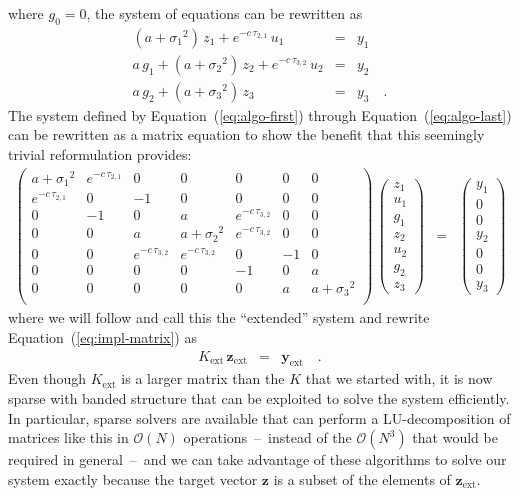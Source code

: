 \documentclass[manuscript, letterpaper]{aastex6}
\renewcommand{\eqref}[1]{\ref{eq:#1}}
\newcommand{\Eq}[1]{Equation~(\eqref{#1})}
\newcommand{\eq}[1]{\Eq{#1}}
\newcommand{\eqlabel}[1]{\label{eq:#1}}
\newcommand{\bvec}[1]{{\ensuremath{\boldsymbol{#1}}}}
\begin{document}
where $g_{0} = 0$,
the system of equations can be rewritten as
\begin{eqnarray}
(a+{\sigma_1}^2)\,z_1 + e^{-c\,\tau_{2,1}}\,u_1 &=& y_1 \\
a\,g_1 + (a+{\sigma_2}^2)\,z_2 + e^{-c\,\tau_{3,2}}\,u_2 &=& y_2 \\
a\,g_2 + (a+{\sigma_3}^2)\,z_3 &=& y_3 \quad. \eqlabel{algo-last}
\end{eqnarray}
The system defined by \eq{algo-first} through \eq{algo-last} can be
rewritten as a matrix equation to show the benefit that this seemingly trivial
reformulation provides:
\begin{eqnarray}
\begin{pmatrix}
    a+{\sigma_1}^2 & e^{-c\,\tau_{2,1}} & 0 & 0 & 0 & 0 & 0 \\
    e^{-c\,\tau_{2,1}} & 0 & -1 & 0 & 0 & 0 & 0 \\
    0 & -1 & 0 & a & e^{-c\,\tau_{3,2}} & 0 & 0 \\
    0 & 0 & a & a+{\sigma_2}^2 & e^{-c\,\tau_{3,2}} & 0 & 0 \\
    0 & 0 & e^{-c\,\tau_{3,2}} & e^{-c\,\tau_{3,2}} & 0 & -1 & 0 \\
    0 & 0 & 0 & 0 & -1 & 0 & a \\
    0 & 0 & 0 & 0 & 0 & a & a+{\sigma_3}^2 \\
\end{pmatrix}\,
\begin{pmatrix}
    z_1 \\ u_1 \\ g_1 \\ z_2 \\ u_2 \\ g_2 \\ z_3
\end{pmatrix} &=&
\begin{pmatrix}
    y_1 \\ 0 \\ 0 \\ y_2 \\ 0 \\ 0 \\ y_3
\end{pmatrix}\nonumber
\end{eqnarray}
where we will follow \citet{Ambikasaran:2015} and call this the ``extended''
system and rewrite \eq{impl-matrix} as
\begin{eqnarray}
    K_\mathrm{ext}\,\bvec{z}_\mathrm{ext} &=& \bvec{y}_\mathrm{ext} \quad.
\end{eqnarray}
Even though $K_\mathrm{ext}$ is a larger matrix than the $K$ that we started
with, it is now sparse with banded structure that can be exploited to solve
the system efficiently.
In particular, sparse solvers are available that can perform a
LU-decomposition of matrices like this in $\mathcal{O}(N)$
operations~--~instead of the $\mathcal{O}(N^3)$ that would be required in
general~--~and we can take advantage of these algorithms to solve our system
exactly because the target vector $\bvec{z}$ is a subset of the elements of
$\bvec{z}_\mathrm{ext}$.
\end{document}
